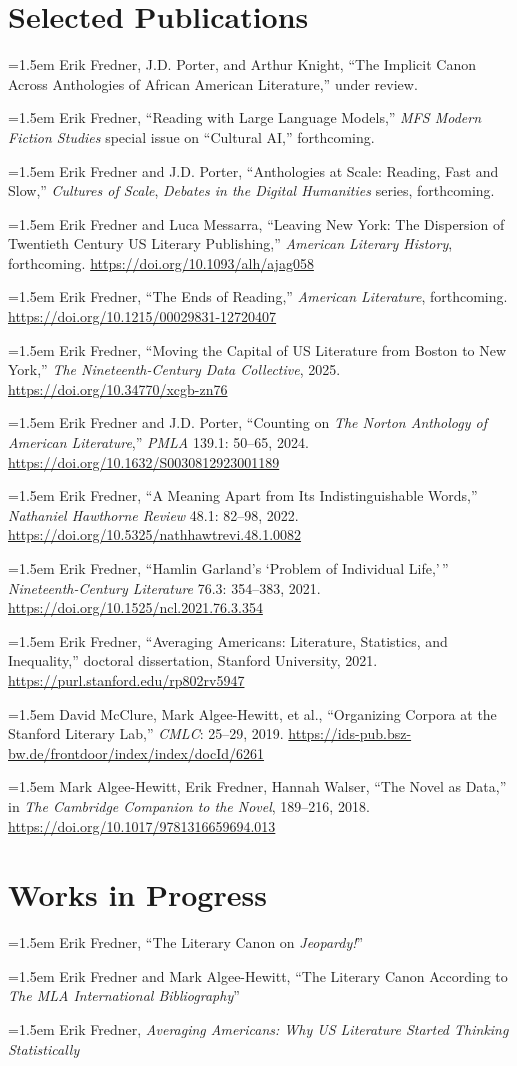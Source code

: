 \documentclass[12pt, letterpaper]{article}
\newcommand{\entry}[1]{\hangindent=1.5em\hangafter=1 #1\par}
\newcommand{\doi}[1]{\url{https://doi.org/#1}}
\begin{document}
\section{Selected Publications}
\entry{Erik Fredner, J.D. Porter, and Arthur Knight, ``The Implicit Canon Across Anthologies of African American Literature,'' under review.}
\entry{Erik Fredner, ``Reading with Large Language Models,'' \textit{MFS Modern Fiction Studies} special issue on ``Cultural AI,'' forthcoming.}
\entry{Erik Fredner and J.D. Porter, ``Anthologies at Scale: Reading, Fast and Slow,'' \textit{Cultures of Scale}, \textit{Debates in the Digital Humanities} series, forthcoming.}
\entry{Erik Fredner and Luca Messarra, ``Leaving New York: The Dispersion of Twentieth Century US Literary Publishing,'' \textit{American Literary History}, forthcoming. \doi{10.1093/alh/ajag058}}
\entry{Erik Fredner, ``The Ends of Reading,'' \textit{American Literature}, forthcoming. \doi{10.1215/00029831-12720407}}
\entry{Erik Fredner, ``Moving the Capital of US Literature from Boston to New York,'' \textit{The Nineteenth-Century Data Collective}, 2025. \doi{10.34770/xcgb-zn76}}
\entry{Erik Fredner and J.D. Porter, ``Counting on \textit{The Norton Anthology of American Literature},'' \textit{PMLA} 139.1: 50--65, 2024. \doi{10.1632/S0030812923001189}}
\entry{Erik Fredner, ``A Meaning Apart from Its Indistinguishable Words,'' \textit{Nathaniel Hawthorne Review} 48.1: 82--98, 2022. \doi{10.5325/nathhawtrevi.48.1.0082}}
\entry{Erik Fredner, ``Hamlin Garland's `Problem of Individual Life,'\,'' \textit{Nineteenth-Century Literature} 76.3: 354--383, 2021. \doi{10.1525/ncl.2021.76.3.354}}
\entry{Erik Fredner, ``Averaging Americans: Literature, Statistics, and Inequality,'' doctoral dissertation, Stanford University, 2021. \url{https://purl.stanford.edu/rp802rv5947}}
\entry{David McClure, Mark Algee-Hewitt, et al., ``Organizing Corpora at the Stanford Literary Lab,'' \textit{CMLC}: 25--29, 2019. \url{https://ids-pub.bsz-bw.de/frontdoor/index/index/docId/6261}}
\entry{Mark Algee-Hewitt, Erik Fredner, Hannah Walser, ``The Novel as Data,'' in \textit{The Cambridge Companion to the Novel}, 189--216, 2018. \doi{10.1017/9781316659694.013}}

\section{Works in Progress}
\entry{Erik Fredner, ``The Literary Canon on \textit{Jeopardy!}''}
\entry{Erik Fredner and Mark Algee-Hewitt, ``The Literary Canon According to \textit{The MLA International Bibliography}''}
\entry{Erik Fredner, \textit{Averaging Americans: Why US Literature Started Thinking Statistically}}
\end{document}
